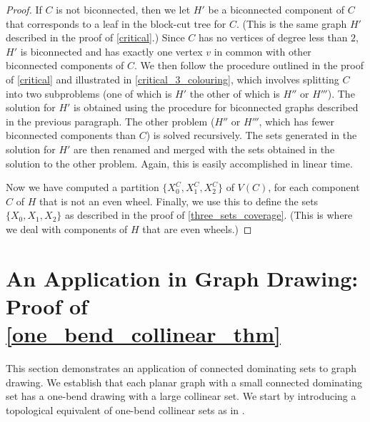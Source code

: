 \documentclass{article}
\theoremstyle{definition}
\begin{document}
\begin{proof}
If $C$ is not biconnected, then we let $H'$ be a biconnected component of $C$ that corresponds to a leaf in the block-cut tree for $C$.  (This is the same graph $H'$ described in the proof of \cref{critical}.)  Since $C$ has no vertices of degree less than $2$, $H'$ is biconnected and has exactly one vertex $v$ in common with other biconnected components of $C$.  We then follow the procedure outlined in the proof of \cref{critical} and illustrated in \cref{critical_3_colouring}, which involves splitting $C$ into two subproblems (one of which is $H'$ the other of which is $H''$ or $H'''$).  The solution for $H'$ is obtained using the procedure for biconnected graphs described in the previous paragraph.  The other problem ($H''$ or $H'''$, which has fewer biconnected components than $C$) is solved recursively.  The sets generated in the solution for $H'$ are then renamed and merged with the sets obtained in the solution to the other problem.  Again, this is easily accomplished in linear time.

Now we have computed a partition $\{X^C_0,X^C_1,X^C_2\}$ of $V(C)$, for each component $C$ of $H$ that is not an even wheel.  Finally, we use this to define the sets $\{X_0,X_1,X_2\}$ as described in the proof of \cref{three_sets_coverage}.  (This is where we deal with components of $H$ that are even wheels.)
\end{proof}






\section{An Application in Graph Drawing: Proof of \cref{one_bend_collinear_thm}}
\label{one_bend}
This section demonstrates an application of connected dominating sets to graph drawing. We establish that each planar graph with a small connected dominating set has a one-bend drawing with a large collinear set. We start by introducing a topological equivalent of one-bend collinear sets as in \cite{DBLP:journals/jocg/LozzoDFMR18}.


\end{document}
